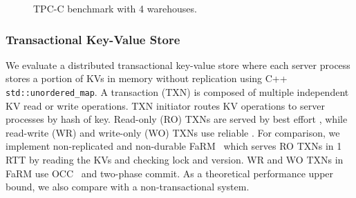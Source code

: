 \begin{figure}[t]
\centering
	\hspace{0.02\textwidth}
    \hspace{0.02\textwidth}
\vspace{-10pt}
\caption{TPC-C benchmark with 4 warehouses.}
\label{fig:tpc-c}
\vspace{-10pt}
\end{figure}


\subsubsection{Transactional Key-Value Store}
\label{subsec:eval-kvs}


We evaluate a distributed transactional key-value store where each server process stores a portion of KVs in memory without replication using C++ \texttt{std::unordered\_map}.
A transaction (TXN) is composed of multiple independent KV read or write operations.
TXN initiator routes KV operations to server processes by hash of key.
Read-only (RO) TXNs are served by best effort \sys{}, while read-write (WR) and write-only (WO) TXNs use reliable \sys{}.
For comparison, we implement non-replicated and non-durable FaRM~\cite{dragojevic2014farm} which serves RO TXNs in 1 RTT by reading the KVs and checking lock and version. WR and WO TXNs in FaRM use OCC~\cite{kung1981optimistic} and two-phase commit.
As a theoretical performance upper bound, we also compare with a non-transactional system.

